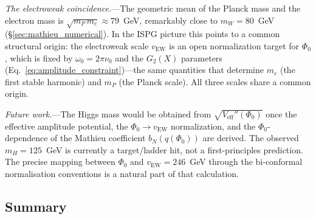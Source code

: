 \documentclass[11pt]{article}
\begin{document}
\textit{The electroweak coincidence.}---The
geometric mean of the Planck mass and the
electron mass is
$\sqrt{m_P\,m_e} \approx 79$~GeV, remarkably
close to $m_W = 80$~GeV
(\S\ref{sec:mathieu_numerical}).
In the ISPG picture this points to a common structural
origin: the electroweak scale $v_{\mathrm{EW}}$ is an
open normalization target for $\Phi_0$, which is fixed by
$\omega_0 = 2\pi\nu_0$ and the $G_2(X)$
parameters
(Eq.~\ref{eq:amplitude_constraint})---the same
quantities that determine $m_e$ (the first
stable harmonic) and $m_P$ (the Planck scale).
All three scales share a common origin.

\textit{Future work.}---The Higgs mass would be obtained
from $\sqrt{V_{\mathrm{eff}}''(\Phi_0)}$ once the
effective amplitude potential, the
$\Phi_0\to v_{\mathrm{EW}}$ normalization, and the
$\Phi_0$-dependence of the Mathieu coefficient
$b_N(q(\Phi_0))$ are derived.  The observed
$m_H=125$~GeV is currently a target/ladder hit, not a
first-principles prediction.  The precise mapping
between $\Phi_0$ and $v_{\mathrm{EW}} = 246$~GeV
through the bi-conformal normalisation conventions is a
natural part of that calculation.

\subsection{Summary}
\label{sec:dim_summary}
\end{document}
